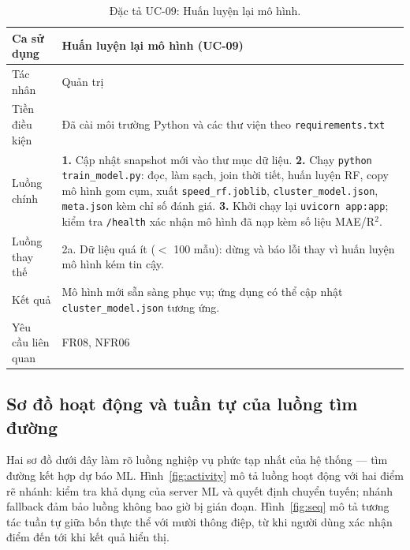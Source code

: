\begin{table}[h!]
\centering
\caption{Đặc tả UC-09: Huấn luyện lại mô hình.}
\label{tab:uc5}
\small
\begin{tabularx}{\textwidth}{lX}
\toprule
\textbf{Ca sử dụng} & Huấn luyện lại mô hình (UC-09)\\
\midrule
Tác nhân & Quản trị\\
Tiền điều kiện & Đã cài môi trường Python và các thư viện theo \texttt{requirements.txt}\\
Luồng chính & \textbf{1.} Cập nhật snapshot mới vào thư mục dữ liệu. \textbf{2.} Chạy \texttt{python train\_model.py}: đọc, làm sạch, join thời tiết, huấn luyện RF, copy mô hình gom cụm, xuất \texttt{speed\_rf.joblib}, \texttt{cluster\_model.json}, \texttt{meta.json} kèm chỉ số đánh giá. \textbf{3.} Khởi chạy lại \texttt{uvicorn app:app}; kiểm tra \texttt{/health} xác nhận mô hình đã nạp kèm số liệu MAE/R$^2$.\\
Luồng thay thế & 2a. Dữ liệu quá ít ($<$ 100 mẫu): dừng và báo lỗi thay vì huấn luyện mô hình kém tin cậy.\\
Kết quả & Mô hình mới sẵn sàng phục vụ; ứng dụng có thể cập nhật \texttt{cluster\_model.json} tương ứng.\\
Yêu cầu liên quan & FR08, NFR06\\
\bottomrule
\end{tabularx}
\end{table}

\subsection{Sơ đồ hoạt động và tuần tự của luồng tìm đường}
Hai sơ đồ dưới đây làm rõ luồng nghiệp vụ phức tạp nhất của hệ thống --- tìm đường kết hợp dự báo ML. Hình~\ref{fig:activity} mô tả luồng hoạt động với hai điểm rẽ nhánh: kiểm tra khả dụng của server ML và quyết định chuyển tuyến; nhánh fallback đảm bảo luồng không bao giờ bị gián đoạn. Hình~\ref{fig:seq} mô tả tương tác tuần tự giữa bốn thực thể với mười thông điệp, từ khi người dùng xác nhận điểm đến tới khi kết quả hiển thị.


